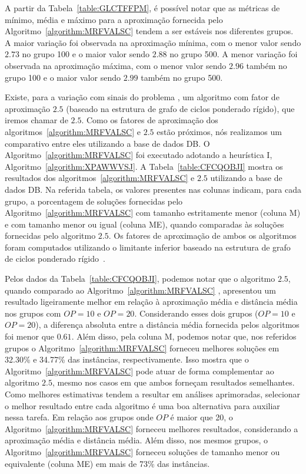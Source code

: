 

A partir da Tabela~\ref{table:GLCTFFPM}, é possível notar que as métricas de mínimo, média e máximo para a aproximação fornecida pelo Algoritmo~\ref{algorithm:MRFVALSC} tendem a ser estáveis nos diferentes grupos. A maior variação foi observada na aproximação mínima, com o menor valor sendo $2.73$ no grupo 100 e o maior valor sendo $2.88$ no grupo 500. A menor variação foi observada na aproximação máxima, com o menor valor sendo $2.96$ também no grupo 100 e o maior valor sendo $2.99$ também no grupo 500. 

Existe, para a variação com sinais do problema \SbIRTM{}, um algoritmo com fator de aproximação $2.5$ (baseado na estrutura de grafo de ciclos ponderado rígido), que iremos chamar de $2.5$\SbIRTM{}. Como os fatores de aproximação dos algoritmos~\ref{algorithm:MRFVALSC} e $2.5$\SbIRTM{} estão próximos, nós realizamos um comparativo entre eles utilizando a base de dados DB\textsubscript{\SbIRTM}. O Algoritmo~\ref{algorithm:MRFVALSC} foi executado adotando a heurística I, Algoritmo~\ref{algorithm:XPAWWVSJ}. A Tabela~\ref{table:CFCQOBJI} mostra os resultados dos algoritmos~\ref{algorithm:MRFVALSC} e $2.5$\SbIRTM{} utilizando a base de dados DB\textsubscript{\SbIRTM}. Na referida tabela, os valores presentes nas colunas indicam, para cada grupo, a porcentagem de soluções fornecidas pelo Algoritmo~\ref{algorithm:MRFVALSC} com tamanho estritamente menor (coluna M) e com tamanho menor ou igual (coluna ME), quando comparadas às soluções fornecidas pelo algoritmo $2.5$\SbIRTM{}. Os fatores de aproximação de ambos os algoritmos foram computados utilizando o limitante inferior baseado na estrutura de grafo de ciclos ponderado rígido~\cite[Teorema 7.6]{2021a-oliveira-etal}.



Pelos dados da Tabela~\ref{table:CFCQOBJI}, podemos notar que o algoritmo $2.5$\SbIRTM{}, quando comparado ao Algoritmo~\ref{algorithm:MRFVALSC} , apresentou um resultado ligeiramente melhor em relação à aproximação média e distância média nos grupos com $OP =10$ e $OP=20$. Considerando esses dois grupos ($OP=10$ e $OP=20$), a diferença absoluta entre a distância média fornecida pelos algoritmos foi menor que $0.61$. Além disso, pela coluna M, podemos notar que, nos referidos grupos o Algoritmo~\ref{algorithm:MRFVALSC} forneceu melhores soluções em 32.30\% e 34.77\% das instâncias, respectivamente. Isso mostra que o Algoritmo~\ref{algorithm:MRFVALSC} pode atuar de forma complementar ao algoritmo $2.5$\SbIRTM{}, mesmo nos casos em que ambos forneçam resultados semelhantes. Como melhores estimativas tendem a resultar em análises aprimoradas, selecionar o melhor resultado entre cada algoritmo é uma boa alternativa para auxiliar nessa tarefa. Em relação aos grupos onde $OP$ é maior que 20, o Algoritmo~\ref{algorithm:MRFVALSC} forneceu melhores resultados, considerando a aproximação média e distância média. Além disso, nos mesmos grupos, o Algoritmo~\ref{algorithm:MRFVALSC} forneceu soluções de tamanho menor ou equivalente (coluna ME) em mais de 73\% das instâncias.

